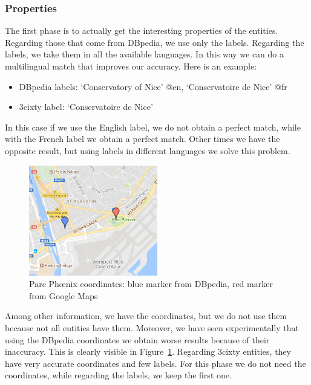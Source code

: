 \documentclass[paper=a4, fontsize=11pt]{scrartcl}
\begin{document}
\subsubsection{Properties}
The first phase is to actually get the interesting properties of the entities. Regarding those that come from DBpedia, we use only the labels. Regarding the labels, we take them in all the available languages. In this way we can do a multilingual match that improves our accuracy.
Here is an example:
\begin{itemize}
\item DBpedia labels: `Conservatory of Nice' @en, `Conservatoire de Nice' @fr
\item 3cixty label: `Conservatoire de Nice'
\end{itemize}
In this case if we use the English label, we do not obtain a perfect match, while with the French label we obtain a perfect match. Other times we have the opposite result, but using labels in different languages we solve this problem.

\begin{figure}[!htb]
  \centering
    \includegraphics[width=0.5\textwidth]{images/parc.png}
    \caption{Parc Phœnix coordinates: blue marker from DBpedia, red marker from Google Maps}
    \label{fig:parc}
\end{figure}

Among other information, we have the coordinates, but we do not use them because not all entities have them. Moreover, we have seen experimentally that using the DBpedia coordinates we obtain worse results because of their inaccuracy. This is clearly visible in Figure~\ref{fig:parc}.
Regarding 3cixty entities, they have very accurate coordinates and few labels. For this phase we do not need the coordinates, while regarding the labels, we keep the first one.
\end{document}
